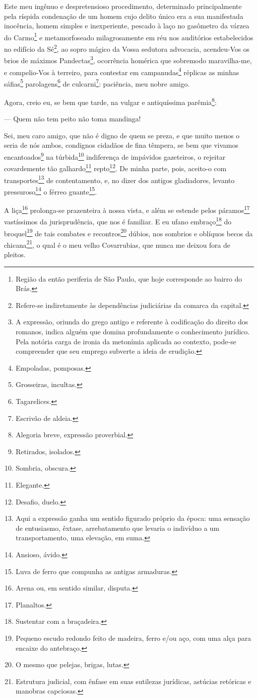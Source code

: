 Este meu ingênuo e despretensioso procedimento, determinado
principalmente pela ríspida condenação de um homem cujo delito único era
a sua manifestada inocência, homem simples e inexperiente, pescado à
laço no gasômetro da várzea do Carmo\footnote{ Região da então
  periferia de São Paulo, que hoje corresponde ao bairro do Brás.} e
metamorfoseado milagrosamente em réu nos auditórios estabelecidos no
edifício da Sé\footnote{ Refere-se indiretamente às dependências
  judiciárias da comarca da capital.}, ao sopro mágico da Vossa sedutora
advocacia, acendeu-Vos os brios de máximos Pandectas\footnote{ A
  expressão, oriunda do grego antigo e referente à codificação do
  direito dos romanos, indica alguém que domina profundamente o
  conhecimento jurídico. Pela notória carga de ironia da metonímia
  aplicada ao contexto, pode-se compreender que seu emprego subverte a
  ideia de erudição.}, ocorrência homérica que sobremodo maravilha-me, e
compelio-Vos à terreiro, para contestar em campanudas\footnote{
  Empoladas, pomposas.} réplicas as minhas sáfias\footnote{ Grosseiras,
  incultas.} parolagens\footnote{ Tagarelices.} de culcarni\footnote{
  Escrivão de aldeia.}: paciência, meu nobre amigo.

Agora, creio eu, se bem que tarde, na vulgar e antiquíssima
parêmia\footnote{ Alegoria breve, expressão proverbial.}:

--- Quem não tem peito não toma mandinga!

Sei, meu caro amigo, que não é digno de quem se preza, e que muito menos
o seria de nós ambos, condignos cidadãos de fina têmpera, se bem que
vivamos encantoados\footnote{ Retirados, isolados.} na
túrbida\footnote{ Sombria, obscura.} indiferença de impávidos
gazeteiros, o rejeitar covardemente tão galhardo\footnote{ Elegante.}
repto\footnote{ Desafio, duelo.}. De minha parte, pois, aceito-o com
transportes\footnote{ Aqui a expressão ganha um sentido figurado
  próprio da época: uma sensação de entusiasmo, êxtase, arrebatamento
  que levaria o indivíduo a um transportamento, uma elevação, em suma.}
de contentamento, e, no dizer dos antigos gladiadores, levanto
pressuroso\footnote{ Ansioso, ávido.} o férreo guante\footnote{ Luva
  de ferro que compunha as antigas armaduras.}.

A liça\footnote{ Arena ou, em sentido similar, disputa.} prolonga-se
prazenteira à nossa vista, e além se estende pelos páramos\footnote{
  Planaltos.} vastíssimos da jurisprudência, que nos é familiar. E eu
ufano embraço\footnote{ Sustentar com a braçadeira.} do
broquel\footnote{ Pequeno escudo redondo feito de madeira, ferro e/ou
  aço, com uma alça para encaixe do antebraço.} de tais combates e
recontros\footnote{ O mesmo que pelejas, brigas, lutas.} dúbios, nos
sombrios e oblíquos becos da chicana\footnote{ Estrutura judicial, com
  ênfase em suas sutilezas jurídicas, astúcias retóricas e manobras
  capciosas.}, o qual é o meu velho Covarrubias, que nunca me deixou
fora de pleitos.

